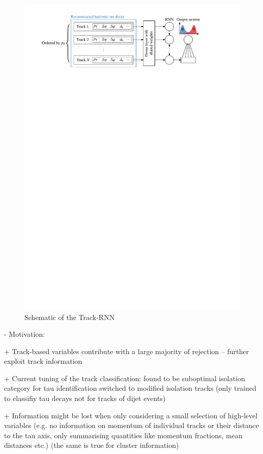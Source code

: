 \begin{figure}[ht]
  \centering
  \includegraphics[scale=0.9]{./figures/rnn/track_rnn_schematic.pdf}
  \caption{Schematic of the Track-RNN}
  \label{fig:track_rnn_schematic}
\end{figure}


- Motivation:

+ Track-based variables contribute with a large majority of rejection -- further
exploit track information

+ Current tuning of the track classification: found to be suboptimal isolation
category for tau identification switched to modified isolation tracks (only
trained to classifiy tau decays not for tracks of dijet events)

+ Information might be lost when only considering a small selection of
high-level variables (e.g. no information on momentum of individual tracks or
their distance to the tau axis, only summarising quantities like momentum
fractions, mean distances etc.) (the same is true for cluster information)

